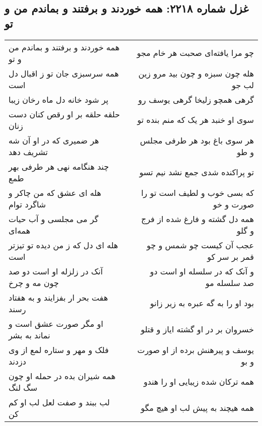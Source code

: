 \begin{center}
\section*{غزل شماره ۲۲۱۸: همه خوردند و برفتند و بماندم من و تو}
\label{sec:2218}
\begin{longtable}{l p{0.5cm} r}
همه خوردند و برفتند و بماندم من و تو
&&
چو مرا یافته‌ای صحبت هر خام مجو
\\
همه سرسبزی جان تو ز اقبال دل است
&&
هله چون سبزه و چون بید مرو زین لب جو
\\
پر شود خانه دل ماه رخان زیبا
&&
گرهی همچو زلیخا گرهی یوسف رو
\\
حلقه حلقه بر او رقص کنان دست زنان
&&
سوی او خنبد هر یک که منم بنده تو
\\
هر ضمیری که در او آن شه تشریف دهد
&&
هر سوی باغ بود هر طرفی مجلس و طو
\\
چند هنگامه نهی هر طرفی بهر طمع
&&
تو پراکنده شدی جمع نشد نیم تسو
\\
هله ای عشق که من چاکر و شاگرد توام
&&
که بسی خوب و لطیف است تو را صورت و خو
\\
گر می مجلسی و آب حیات همه‌ای
&&
همه دل گشته و فارغ شده از فرج و گلو
\\
هله ای دل که ز من دیده تو تیزتر است
&&
عجب آن کیست چو شمس و چو قمر بر سر کو
\\
آنک در زلزله او است دو صد چون مه و چرخ
&&
و آنک که در سلسله او است دو صد سلسله مو
\\
هفت بحر ار بفزایند و به هفتاد رسند
&&
بود او را به گه عبره به زیر زانو
\\
او مگر صورت عشق است و نماند به بشر
&&
خسروان بر در او گشته ایاز و قتلو
\\
فلک و مهر و ستاره لمع از وی دزدند
&&
یوسف و پیرهنش برده از او صورت و بو
\\
همه شیران بده در حمله او چون سگ لنگ
&&
همه ترکان شده زیبایی او را هندو
\\
لب ببند و صفت لعل لب او کم کن
&&
همه هیچند به پیش لب او هیچ مگو
\\
\end{longtable}
\end{center}
